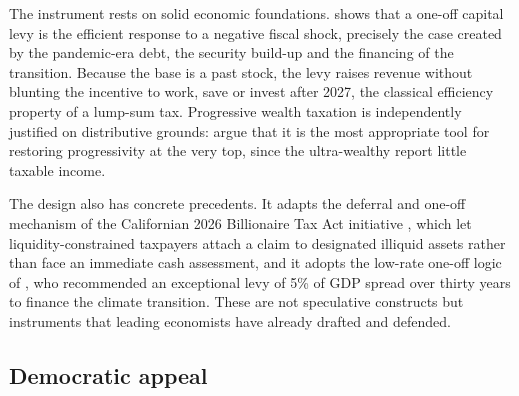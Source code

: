 \documentclass[../../main]{subfiles}
\begin{document}
The instrument rests on solid economic foundations. \citet{Farhi2010} shows that a one-off capital levy is
the efficient response to a negative fiscal shock, %
precisely the case created by
the pandemic-era debt, the security build-up and the financing of the transition. Because the base is a past stock, the levy raises revenue without blunting the incentive to work, save or invest after 2027, the classical efficiency property of a lump-sum tax. Progressive wealth taxation is independently justified on distributive grounds: \citet{SaezZucman2019} argue that %
it is the most appropriate tool for restoring progressivity at the very top, since the ultra-wealthy report little taxable income.

The design also has concrete precedents. It adapts the deferral and one-off mechanism of the Californian 2026 Billionaire Tax Act initiative \citep{CABillionaireTax2026}, which let liquidity-constrained taxpayers attach a claim to designated illiquid assets rather than face an immediate cash assessment, and it adopts the low-rate one-off logic of \citet{PisaniFerryMahfouz2023}, who recommended an exceptional levy of 5\% of GDP spread over thirty years to finance the climate transition. These are not speculative constructs but instruments that leading economists have already drafted and defended.

\subsection{Democratic appeal}
\end{document}
